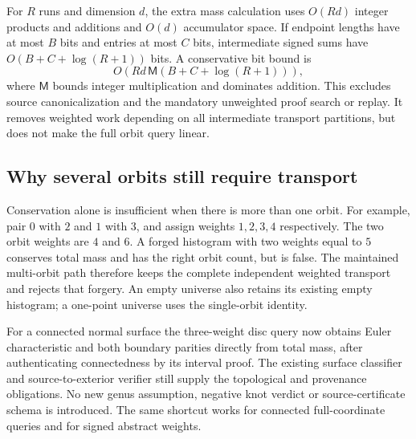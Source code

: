 For $R$ runs and dimension $d$, the extra mass calculation uses $O(Rd)$
integer products and additions and $O(d)$ accumulator space. If endpoint
lengths have at most $B$ bits and entries at most $C$ bits, intermediate
signed sums have $O(B+C+\log(R+1))$ bits. A conservative bit bound is
\[
 O\!\left(Rd\,\mathsf M(B+C+\log(R+1))\right),
\]
where $\mathsf M$ bounds integer multiplication and dominates addition.
This excludes source canonicalization and the mandatory unweighted proof
search or replay. It removes weighted work depending on all intermediate
transport partitions, but does not make the full orbit query linear.

\subsection{Why several orbits still require transport}

Conservation alone is insufficient when there is more than one orbit.
For example, pair $0$ with $2$ and $1$ with $3$, and assign weights
$1,2,3,4$ respectively. The two orbit weights are $4$ and $6$. A forged
histogram with two weights equal to $5$ conserves total mass and has the
right orbit count, but is false. The maintained multi-orbit path therefore
keeps the complete independent weighted transport and rejects that forgery.
An empty universe also retains its existing empty histogram; a one-point
universe uses the single-orbit identity.

For a connected normal surface the three-weight disc query now obtains
Euler characteristic and both boundary parities directly from total mass,
after authenticating connectedness by its interval proof. The existing
surface classifier and source-to-exterior verifier still supply the
topological and provenance obligations. No new genus assumption, negative
knot verdict or source-certificate schema is introduced. The same shortcut
works for connected full-coordinate queries and for signed abstract weights.


